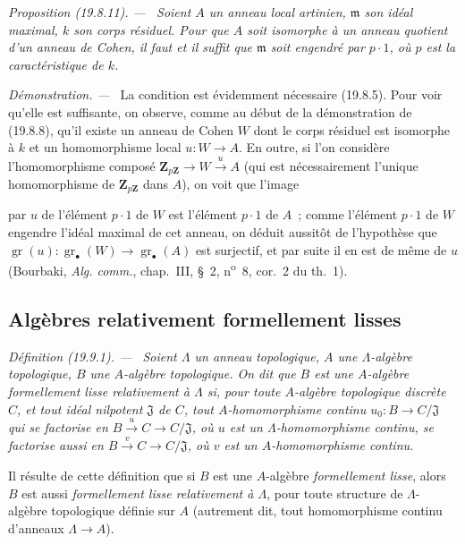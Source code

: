 \documentclass[10pt,oneside]{book}
\makeatletter
\newcommand{\gr}{\operatorname{gr}}
\newcommand{\setmanualcurrentlabel}[1]{\def\@currentlabel{#1}}
\newcommand{\oldpage}[2][]{%
  \setcounter{footnote}{0}%
  \marginpar{\scriptsize\textbf{#1}~|~#2}\ignorespaces}
\newenvironment{definition}[1][]{%
  \setmanualcurrentlabel{#1}\par\medskip\noindent\itshape Définition (#1). ---\ }{\par}
\newenvironment{proposition}[1][]{%
  \setmanualcurrentlabel{#1}\par\medskip\noindent\itshape Proposition (#1). ---\ }{\par}
\newenvironment{proof}{%
  \par\medskip\noindent\textit{Démonstration. ---\ }}{\par}
\makeatother
\begin{document}
\begin{proposition}[19.8.11]
\label{0.19.8.11-fr}
Soient $A$ un anneau local artinien, $\mathfrak m$ son idéal maximal, $k$ son
corps résiduel. Pour que $A$ soit isomorphe à un anneau quotient d'un anneau de
Cohen, il faut et il suffit que $\mathfrak m$ soit engendré par $p\cdot1$, où
$p$ est la caractéristique de $k$.
\end{proposition}

\begin{proof}
La condition est évidemment nécessaire (19.8.5). Pour voir qu'elle est
suffisante, on observe, comme au début de la démonstration de (19.8.8), qu'il
existe un anneau de Cohen $W$ dont le corps résiduel est isomorphe à $k$ et un
homomorphisme local $u:W\to A$. En outre, si l'on considère l'homomorphisme
composé $\mathbf Z_{p\mathbf Z}\to W\xrightarrow{u}A$ (qui est nécessairement
l'unique homomorphisme de $\mathbf Z_{p\mathbf Z}$ dans $A$), on voit que
l'image

\oldpage[0\textsubscript{IV-1}]{114}

par $u$ de l'élément $p\cdot1$ de $W$ est l'élément $p\cdot1$ de $A$~; comme
l'élément $p\cdot1$ de $W$ engendre l'idéal maximal de cet anneau, on déduit
aussitôt de l'hypothèse que
$\gr(u):\gr_\bullet(W)\to\gr_\bullet(A)$ est surjectif, et par suite il en est
de même de $u$ (Bourbaki, \emph{Alg. comm.}, chap.~III, §~2,
n\textsuperscript{o}~8, cor.~2 du th.~1).
\end{proof}

\subsection{Algèbres relativement formellement lisses}
\label{subsection:0.19.9-fr}

\begin{definition}[19.9.1]
\label{0.19.9.1-fr}
Soient $\Lambda$ un anneau topologique, $A$ une $\Lambda$-algèbre topologique,
$B$ une $A$-algèbre topologique. On dit que $B$ est une $A$-algèbre
\emph{formellement lisse relativement à $\Lambda$} si, pour toute $A$-algèbre
topologique discrète $C$, et tout idéal nilpotent $\mathfrak J$ de $C$, tout
$A$-homomorphisme continu $u_0:B\to C/\mathfrak J$ qui se factorise en
$B\xrightarrow{u}C\to C/\mathfrak J$, où $u$ est un $\Lambda$-homomorphisme
continu, se factorise aussi en $B\xrightarrow{v}C\to C/\mathfrak J$, où $v$
est un $A$-homomorphisme continu.
\end{definition}

Il résulte de cette définition que si $B$ est une $A$-algèbre \emph{formellement
lisse}, alors $B$ est aussi \emph{formellement lisse relativement à
$\Lambda$}, pour toute structure de $\Lambda$-algèbre topologique définie sur
$A$ (autrement dit, tout homomorphisme continu d'anneaux $\Lambda\to A$).
\end{document}
